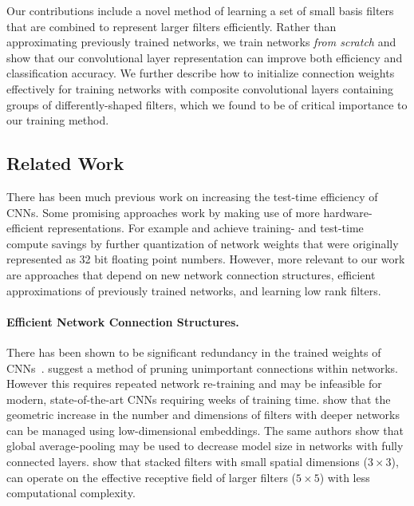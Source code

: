 \documentclass[thesis]{subfiles}
\begin{document}
    Our contributions include a novel method of learning a set of small basis filters that are combined to represent larger filters efficiently. Rather than approximating previously trained networks, we train networks \emph{from scratch} and show that our convolutional layer representation can improve both efficiency and classification accuracy. We further describe how to initialize connection weights effectively for training networks with composite convolutional layers containing groups of differently-shaped filters, which we found to be of critical importance to our training method.
    
    \subsection{Related Work}
    \label{relatedwork}
    There has been much previous work on increasing the test-time efficiency of CNNs. Some promising approaches work by making use of more hardware-efficient representations. For example \citet{1502.02551v1} and \citet{vanhoucke2011improving} achieve training- and test-time compute savings by further quantization of network weights that were originally represented as 32 bit floating point numbers. However, more relevant to our work are approaches that depend on new network connection structures, efficient approximations of previously trained networks, and learning low rank filters. 
    
    \paragraph{Efficient Network Connection Structures.}
    There has been shown to be significant redundancy in the trained weights of CNNs~\citep{denil2013predicting}. \citet{lecun1989optimal} suggest a method of pruning unimportant connections within networks. However this requires repeated network re-training and may be infeasible for modern, state-of-the-art CNNs requiring weeks of training time. \citet{journals/corr/LinCY13} show that the geometric increase in the number and dimensions of filters with deeper networks can be managed using low-dimensional embeddings. The same authors show that global average-pooling may be used to decrease model size in networks with fully connected layers. \citet{journals/corr/SimonyanZ14a} show that stacked filters with small spatial dimensions (\eg $3\times 3$), can operate on the effective receptive field of larger filters (\eg $5 \times 5$) with less computational complexity.
    
\end{document}
